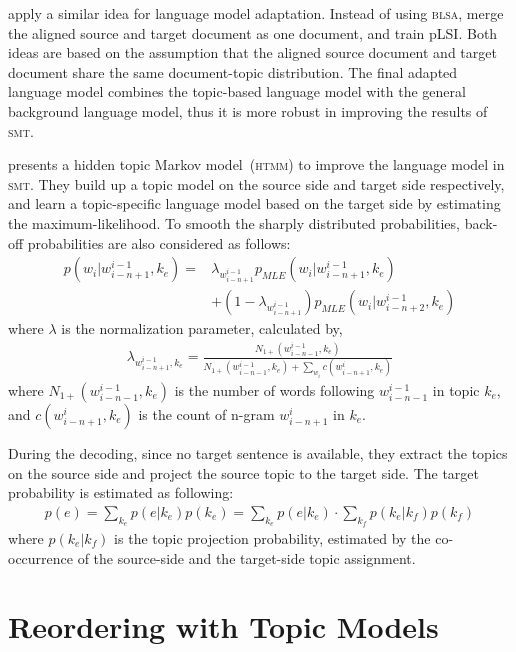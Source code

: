 \citet{Ruiz-2011} apply a similar idea for language model
adaptation. Instead of using \textsc{blsa}, \citet{Ruiz-2011} 
merge the aligned source and target document as one document, and
train pLSI. Both ideas are
based on the assumption that the aligned source document and target
document share the same document-topic distribution. The final adapted
language model combines the topic-based language model with the
general background language model, thus it is more robust in improving
the results of \textsc{smt}.


\citet{Yu-2013} presents a hidden topic Markov model~(\textsc{htmm}) to improve
the language model in \textsc{smt}. They build up a topic model on the
source side and target side respectively, and learn a topic-specific
language model based on the target side by estimating the
maximum-likelihood. To smooth the sharply distributed probabilities,
back-off probabilities are also considered as follows:
\begin{align}
p(w_i | w^{i-1}_{i-n+1}, k_e) = &\lambda_{w^{i-1}_{i-n+1}} p_{MLE}(w_i|w^{i-1}_{i-n+1}, k_e) \\
&+ (1- \lambda_{w^{i-1}_{i-n+1}})p_{MLE}(w_i|w^{i-1}_{i-n+2}, k_e)
\end{align}
where $\lambda$ is the normalization parameter, calculated by,
\begin{align}
\lambda_{w^{i-1}_{i-n+1}, k_e} = \frac{N_{1+}(w^{i-1}_{i-n-1},
  k_e)}{N_{1+}(w^{i-1}_{i-n-1}, k_e) + \sum_{w_i}c(w^i_{i-n+1}, k_e)}
\end{align}
where $N_{1+}(w^{i-1}_{i-n-1}, k_e)$ is the number of words following
$w^{i-1}_{i-n-1}$ in topic $k_e$, and $c(w^i_{i-n+1}, k_e)$ is the
count of n-gram $w^i_{i-n+1}$ in $k_e$.

During the decoding, since no target sentence is available, they extract the topics on the 
source side and project the source topic to the target side. 
The target probability is estimated as following:
\begin{align}
p(e) = \sum_{k_e} p(e|k_e) p(k_e) = \sum_{k_e} p(e|k_e) \cdot \sum_{k_f} p(k_e|k_f) p (k_f)
\end{align}
where $p(k_e|k_f)$ is the topic projection probability, estimated by
the co-occurrence of the source-side and the target-side topic assignment.


\section{Reordering with Topic Models}

